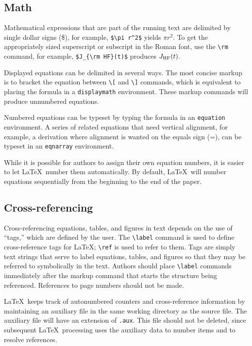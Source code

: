 \subsection{Math}

Mathematical expressions that are part of the running text are
delimited by single dollar signs (\$), for example, \verb"$\pi r^2$" 
yields $\pi r^2$.  To get the appropriately sized superscript or 
subscript in the Roman font, use the \verb"\rm" command, for example, 
\verb"$J_{\rm HF}(t)$" produces $J_{\rm HF}(t)$.

Displayed equations can be delimited in several ways.  The most 
concise markup is to bracket the equation between \verb"\[" and 
\verb"\]" commands, which is equivalent to placing the formula 
in a {\tt displaymath} environment.  These markup commands will 
produce unnumbered equations.

Numbered equations can be typeset by typing the formula in
an {\tt equation} environment.  A series of related equations 
that need vertical alignment, for example, a derivation where 
alignment is wanted on the equals sign (=), can be typeset in 
an {\tt eqnarray} environment.

While it is possible for authors to assign their own equation 
numbers, it is easier to let \LaTeX\ number them automatically.
By default, \LaTeX\ will number equations sequentially from the
beginning to the end of the paper.

\subsection{Cross-referencing}

Cross-referencing equations, tables, and figures in text depends 
on the use of ``tags,'' which are defined by the user.  The 
\verb"\label" command is used to define cross-reference tags 
for \LaTeX; \verb"\ref" is used to refer to them.  Tags are 
simply text strings that serve to label equations, tables, and 
figures so that they may be referred to symbolically in the 
text.  Authors should place \verb"\label" commands immediately 
after the markup command that starts the structure being 
referenced.  References to page numbers should not be made.

\LaTeX\ keeps track of autonumbered counters and cross-reference
information by maintaining an auxiliary file in the same working
directory as the source file.  The auxiliary file will have an
extension of {\tt .aux}.  This file should not be deleted, since
subsequent \LaTeX\ processing uses the auxiliary data to number 
items and to resolve references.

